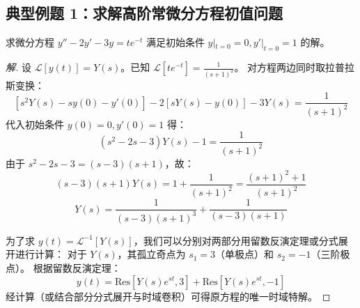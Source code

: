 \subsection{典型例题 1：求解高阶常微分方程初值问题}
\begin{tcolorbox}[colback=orange!5!white, colframe=orange!75!black, title=例题 \thechapter.1]
	求微分方程 $y'' - 2y' - 3y = te^{-t}$ 满足初始条件 $y|_{t=0} = 0, y'|_{t=0} = 1$ 的解。
\end{tcolorbox}
\begin{proof}[解]
	设 $\mathcal{L}[y(t)] = Y(s)$。已知 $\mathcal{L}[te^{-t}] = \frac{1}{(s+1)^2}$。
	对方程两边同时取拉普拉斯变换：
	$$ \left[ s^2Y(s) - s y(0) - y'(0) \right] - 2\left[ sY(s) - y(0) \right] - 3Y(s) = \frac{1}{(s+1)^2} $$
	代入初始条件 $y(0) = 0, y'(0) = 1$ 得：
	$$ (s^2 - 2s - 3)Y(s) - 1 = \frac{1}{(s+1)^2} $$
	由于 $s^2 - 2s - 3 = (s-3)(s+1)$，故：
	$$ (s-3)(s+1)Y(s) = 1 + \frac{1}{(s+1)^2} = \frac{(s+1)^2 + 1}{(s+1)^2} $$
	$$ Y(s) = \frac{1}{(s-3)(s+1)^3} + \frac{1}{(s-3)(s+1)} $$
	
	为了求 $y(t) = \mathcal{L}^{-1}[Y(s)]$，我们可以分别对两部分用留数反演定理或分式展开进行计算：
	对于 $Y(s)$，其孤立奇点为 $s_1 = 3$（单极点）和 $s_2 = -1$（三阶极点）。
	根据留数反演定理：
	$$ y(t) = \text{Res}[Y(s)e^{st}, 3] + \text{Res}[Y(s)e^{st}, -1] $$
	经计算（或结合部分分式展开与时域卷积）可得原方程的唯一时域特解。
\end{proof}

